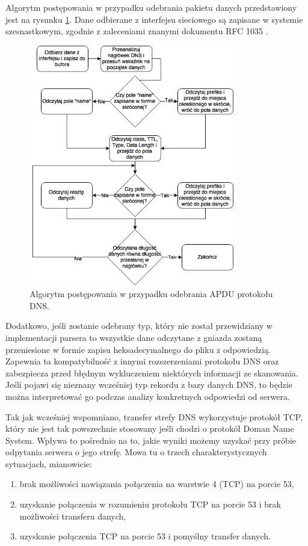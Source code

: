 Algorytm postępowania w przypadku odebrania pakietu danych przedstawiony jest na rysunku \ref{fig:receiving}. Dane odbierane z interfejsu
sieciowego są zapisane w systemie szesnastkowym, zgodnie z zaleceniami znanymi dokumentu RFC 1035 \cite{RFC1035}.

\begin{figure}[h!]
	\centering
	\includegraphics[width=0.8\textwidth]{image/receiving}
	\caption{Algorytm postępowania w przypadku odebrania APDU protokołu DNS.}
	\label{fig:receiving}
\end{figure}

Dodatkowo, jeśli zostanie odebrany typ, który nie został przewidziany w implementacji parsera to wszystkie dane odczytane z
gniazda zostaną przeniesione w formie zapisu heksadecymalnego do pliku z odpowiedzią. Zapewnia ta kompatybilność z innymi
rozszerzeniami protokołu DNS oraz zabezpiecza przed błędnym wykluczeniem niektórych informacji ze skanowania. Jeśli pojawi
się nieznany wcześniej typ rekordu z bazy danych DNS, to będzie można interpretować go podczas analizy konkretnych odpowiedzi
od serwera.

Tak jak wcześniej wspomniano, transfer strefy DNS wykorzystuje protokół TCP, który nie jest tak powszechnie stosowany jeśli chodzi
o protokół Doman Name System. Wpływa to pośrednio na to, jakie wyniki możemy uzyskać przy próbie odpytania serwera o jego strefę. Mowa tu o
trzech charakterystycznych sytuacjach, mianowicie:
\begin{enumerate}
	\item brak możliwości nawiązania połączenia na warstwie 4 (TCP) na porcie 53,
	\item uzyskanie połączenia w rozumieniu protokołu TCP na porcie 53 i brak możliwości transferu danych,
	\item uzyskanie połączenia TCP na porcie 53 i pomyślny transfer danych.
\end{enumerate}

